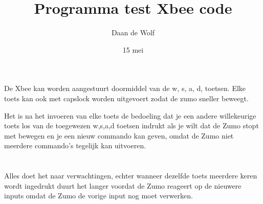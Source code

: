 \documentclass[12pt, a4paper]{article}
\title{Programma test Xbee code}
\author{Daan de Wolf}
\date{15 mei}
\begin{document}
\maketitle
\section*{}
De Xbee kan worden aangestuurt doormiddel van de w, s, a, d, toetsen. Elke toets kan ook met capslock worden uitgevoert zodat de zumo sneller beweegt.

Het is na het invoeren van elke toets de bedoeling dat je een andere willekeurige toets los van de toegewezen w,s,a,d toetsen indrukt als je wilt dat de Zumo stopt met bewegen en je een nieuw commando kan geven, omdat de Zumo niet meerdere commando's tegelijk kan uitvoeren.

\section*{}

Alles doet het naar verwachtingen, echter wanneer dezelfde toets meerdere keren wordt ingedrukt duurt het langer voordat de Zumo reageert op de nieuwere inputs omdat de Zumo de vorige input nog moet verwerken.
\end{document}
